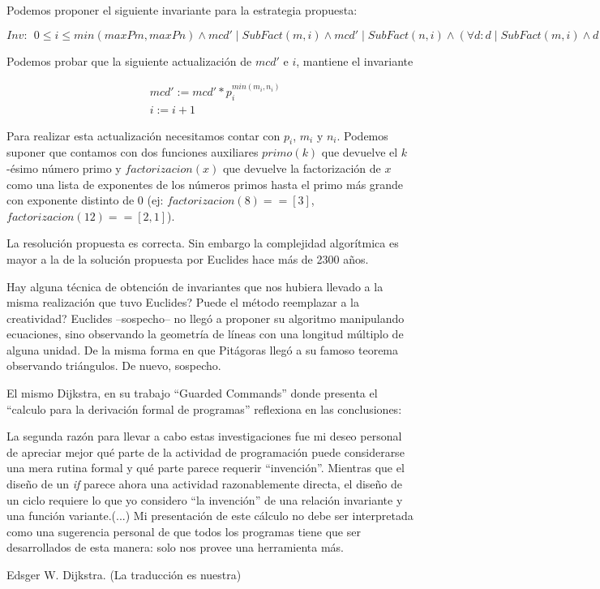 \documentclass[12pt, a4paper, openany, fleqn]{book}
\begin{document}
    Podemos proponer el siguiente invariante para la estrategia propuesta:
    \begin{center}
        \begin{math}
            Inv:\ \  0 \leqslant i \leqslant min(maxPm, maxPn) \land mcd' \mathrel{|} SubFact(m, i) \land mcd' \mathrel{|} SubFact(n, i) \land (\forall d: d \mathrel{|} SubFact(m, i) \land d \mathrel{|} SubFact(n, i) : d \leq mcd') 
        \end{math}
    \end{center}

    Podemos probar que la siguiente actualización de $mcd'$ e $i$, mantiene el invariante

    \begin{align*}
        & mcd' := mcd' * p_{i}^{min(m_{i}, n_{i})} \\
        & i := i + 1
    \end{align*}

    Para realizar esta actualización necesitamos contar con $p_{i}$, $m_{i}$ y $n_{i}$.
    Podemos suponer que contamos con dos funciones auxiliares $primo(k)$ que devuelve el $k$-ésimo número primo y $factorizacion(x)$ que devuelve la factorización de $x$ como una lista de exponentes de los números primos hasta el primo más grande con exponente distinto de 0 (ej: $factorizacion(8) == [3]$, $factorizacion(12) == [2,1]$).

    La resolución propuesta es correcta. Sin embargo la complejidad algorítmica es mayor a la de la solución propuesta por Euclides hace más de 2300 años.

    Hay alguna técnica de obtención de invariantes que nos hubiera llevado a la misma realización que tuvo Euclides? Puede el método reemplazar a la creatividad?
    Euclides --sospecho-- no llegó a proponer su algoritmo manipulando ecuaciones, sino observando la geometría de líneas con una longitud múltiplo de alguna unidad. De la misma forma en que Pitágoras llegó a su famoso teorema observando triángulos. De nuevo, sospecho.

    El mismo Dijkstra, en su trabajo ``Guarded Commands''\cite{EWD:EWD418} donde presenta el ``calculo para la derivación formal de programas'' reflexiona en las conclusiones:

    \begin{quoting}
        La segunda razón para llevar a cabo estas investigaciones fue mi deseo personal de apreciar mejor qué parte de la actividad de programación puede considerarse una mera rutina formal y qué parte parece requerir ``invención''. Mientras que el diseño de un \textit{if} parece ahora una actividad razonablemente directa, el diseño de un ciclo requiere lo que yo considero ``la invención'' de una relación invariante y una función variante.(...) Mi presentación de este cálculo no debe ser interpretada como una sugerencia personal de que todos los programas tiene que ser desarrollados de esta manera: solo nos provee una herramienta más.
    \end{quoting} Edsger W. Dijkstra. (La traducción es nuestra)
\end{document}
